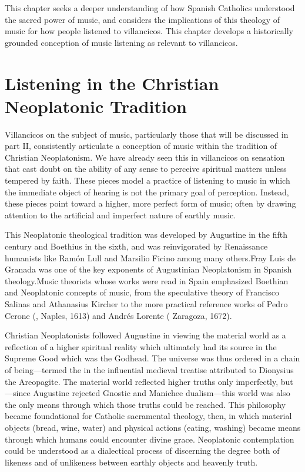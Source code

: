This chapter seeks a deeper understanding of how Spanish Catholics understood the sacred power of music, and considers the implications of this theology of music for how people listened to villancicos.
This chapter develops a historically grounded conception of music listening as relevant to villancicos.

\section{Listening in the Christian Neoplatonic Tradition}

Villancicos on the subject of music, particularly those that will be discussed in part II, consistently articulate a conception of music within the tradition of Christian Neoplatonism.
We have already seen this in villancicos on sensation that cast doubt on the ability of any sense to perceive spiritual matters unless tempered by faith.
These pieces model a practice of listening to music in which the immediate object of hearing is not the primary goal of perception.
Instead, these pieces point toward a higher, more perfect form of music; often by drawing attention to the artificial and imperfect nature of earthly music.

This Neoplatonic theological tradition was developed by Augustine in the fifth century and Boethius in the sixth, and was reinvigorated by Renaissance humanists like Ramón Lull and Marsilio Ficino among many others.
Fray Luis de Granada was one of the key exponents of Augustinian Neoplatonism in Spanish theology.
Music theorists whose works were read in Spain emphasized Boethian and Neoplatonic concepts of music, from the speculative theory of Francisco Salinas and Athanasius Kircher to the more practical reference works of Pedro Cerone (, Naples, 1613) and Andrés Lorente ( Zaragoza, 1672).

Christian Neoplatonists followed Augustine in viewing the material world as a reflection of a higher spiritual reality which ultimately had its source in the Supreme Good which was the Godhead.
The universe was thus ordered in a chain of being---termed the  in the influential medieval treatise attributed to Dionysius the Areopagite.\citXXX{}
The material world reflected higher truths only imperfectly, but---since Augustine rejected Gnostic and Manichee dualism---this world was also the only means through which those truths could be reached.
This philosophy became foundational for Catholic sacramental theology, then, in which material objects (bread, wine, water) and physical actions (eating, washing)
became means through which humans could encounter divine grace.\citXXX{}
Neoplatonic contemplation could be understood as a dialectical process of discerning the degree both of likeness and of unlikeness between earthly objects and heavenly truth.

